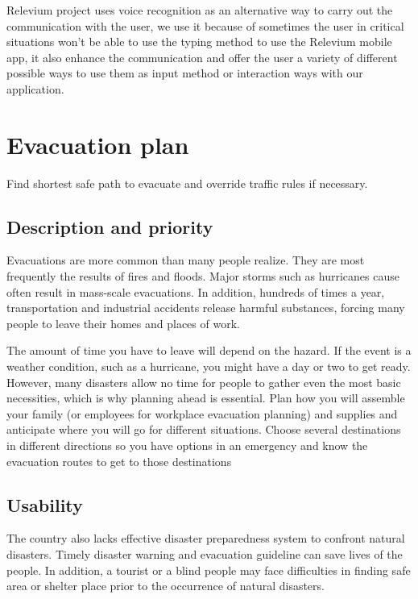 \documentclass{scrreprt}
\begin{document}
Relevium project uses voice recognition as an alternative way to carry out the communication with the user, we use it because of sometimes the user in critical situations won’t be able to use the typing method to use the Relevium mobile app, it also enhance the communication and offer the user a variety of different possible ways to use them as input method or interaction ways with our application.

\newpage

\section{Evacuation plan}
Find shortest safe path to evacuate and override traffic rules if necessary.


\subsection{Description and priority}

Evacuations are more common than many people realize. They are most frequently the results of fires and floods. Major storms such as hurricanes cause often result in mass-scale evacuations. In addition, hundreds of times a year, transportation and industrial accidents release harmful substances, forcing many people to leave their homes and places of work.

The amount of time you have to leave will depend on the hazard. If the event is a weather condition, such as a hurricane, you might have a day or two to get ready. However, many disasters allow no time for people to gather even the most basic necessities, which is why planning ahead is essential. Plan how you will assemble your family (or employees for workplace evacuation planning) and supplies and anticipate where you will go for different situations. Choose several destinations in different directions so you have options in an emergency and know the evacuation routes to get to those destinations


\subsection{Usability}

The country also lacks effective disaster preparedness system to confront natural disasters. Timely disaster warning and evacuation guideline can save lives of the people. In addition, a tourist or a blind people may face difficulties in finding safe area or shelter place prior to the occurrence of natural disasters.
\end{document}
